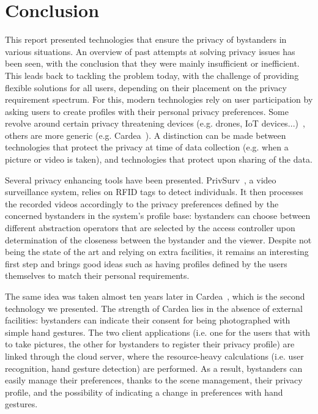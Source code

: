 \documentclass[conference]{IEEEtran}
\begin{document}
\section{Conclusion}\label{Conclusion}
This report presented technologies that ensure the privacy of bystanders in various situations. An overview of past attempts at solving privacy issues has been seen, with the conclusion that they were mainly insufficient or inefficient. This leads back to tackling the problem today, with the challenge of providing flexible solutions for all users, depending on their placement on the privacy requirement spectrum. For this, modern technologies rely on user participation by asking users to create profiles with their personal privacy preferences. Some revolve around certain privacy threatening devices (e.g. drones, \ac{IoT} devices...)~\cite{yao2017privacy, bernd2020bystanders}, others are more generic (e.g. Cardea~\cite{shu2016cardea}). A distinction can be made between technologies that protect the privacy at time of data collection (e.g. when a picture or video is taken), and technologies that protect upon sharing of the data.

Several privacy enhancing tools have been presented. PrivSurv~\cite{chinomi2008PriSurv}, a video surveillance system, relies on  \ac{RFID} tags to detect individuals. It then processes the recorded videos accordingly to the privacy preferences defined by the concerned bystanders in the system's profile base: bystanders can choose between different abstraction operators that are selected by the access controller upon determination of the closeness between the bystander and the viewer. Despite not being the state of the art and relying on extra facilities, it remains an interesting first step and brings good ideas such as having profiles defined by the users themselves to match their personal requirements. 

The same idea was taken almost ten years later in Cardea~\cite{shu2016cardea}, which is the second technology we presented. The strength of Cardea lies in the absence of external facilities: bystanders can indicate their consent for being photographed with simple hand gestures. The two client applications (i.e. one for the users that with to take pictures, the other for bystanders to register their privacy profile) are linked through the cloud server, where the resource-heavy calculations (i.e. user recognition, hand gesture detection) are performed. As a result, bystanders can easily manage their preferences, thanks to the scene management, their privacy profile, and the possibility of indicating a change in preferences with hand gestures. 
\end{document}
